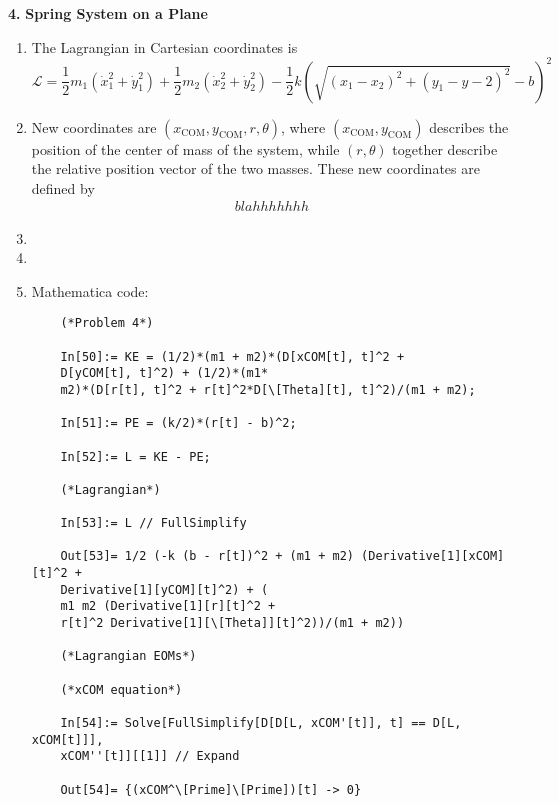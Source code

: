 \documentclass{article}
\theoremstyle{definition}
\newcommand{\lag}{\mathcal{L}}
\newcommand{\f}[2]{\frac{#1}{#2}}
\newcommand{\lp}{\left(}
\newcommand{\rp}{\right)}
\begin{document}
\newpage
\noindent \textbf{4.} \textbf{Spring System on a Plane}

\begin{enumerate}[label = (\alph*)]
	\item The Lagrangian in Cartesian coordinates is 
	\begin{equation*}
	\boxed{
	\lag = \f{1}{2}m_1(\dot{x}_1^2 + \dot{y}_1^2)+ \f{1}{2}m_2(\dot{x}_2^2 + \dot{y}_2^2) - \f{1}{2}k \lp \sqrt{(x_1-x_2)^2+(y_1-y-2)^2} -b \rp^2
	}
	\end{equation*}
	
	
	
	
	\item New coordinates are  $(x_\text{COM},y_{\text{COM}},r,\theta)$, where $(x_\text{COM}, y_\text{COM})$ describes the position of the center of mass of the system, while $(r,\theta)$ together describe the relative position vector of the two masses. These new coordinates are defined by 
	\begin{align*}
	blahhhhhhh
	\end{align*}
	
	
	
	\item 
	
	
	
	
	\item 
	
	
	
	\item Mathematica code:
	\begin{lstlisting}
	(*Problem 4*)
	
	In[50]:= KE = (1/2)*(m1 + m2)*(D[xCOM[t], t]^2 + 
	D[yCOM[t], t]^2) + (1/2)*(m1*
	m2)*(D[r[t], t]^2 + r[t]^2*D[\[Theta][t], t]^2)/(m1 + m2);
	
	In[51]:= PE = (k/2)*(r[t] - b)^2;
	
	In[52]:= L = KE - PE;
	
	(*Lagrangian*)
	
	In[53]:= L // FullSimplify
	
	Out[53]= 1/2 (-k (b - r[t])^2 + (m1 + m2) (Derivative[1][xCOM][t]^2 + 
	Derivative[1][yCOM][t]^2) + (
	m1 m2 (Derivative[1][r][t]^2 + 
	r[t]^2 Derivative[1][\[Theta]][t]^2))/(m1 + m2))
	
	(*Lagrangian EOMs*)
	
	(*xCOM equation*)
	
	In[54]:= Solve[FullSimplify[D[D[L, xCOM'[t]], t] == D[L, xCOM[t]]], 
	xCOM''[t]][[1]] // Expand
	
	Out[54]= {(xCOM^\[Prime]\[Prime])[t] -> 0}
	

\end{lstlisting}
\end{enumerate}
\end{document}
